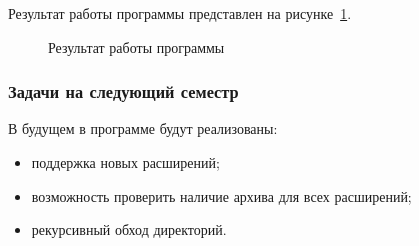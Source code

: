 Результат работы программы представлен на рисунке~\ref{result_ilya:result_ilya}.

\begin{figure}[ht]                                          %
\caption{Результат работы программы}
\label{result_ilya:result_ilya}
\end{figure}

\subsubsection{Задачи на следующий семестр}
В будущем в программе будут реализованы:
\begin{itemize}
\item  поддержка новых расширений;
\item  возможность проверить наличие архива для всех расширений;
\item  рекурсивный обход директорий.
\end{itemize}

\clearpage

